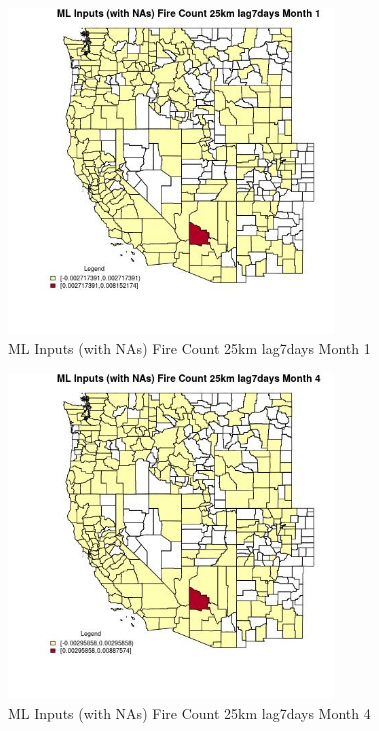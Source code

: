 \begin{figure} 
\centering  
\includegraphics[width=0.77\textwidth]{Code_Outputs/Report_ML_input_PM25_Step4_part_e_de_duplicated_aves_compiled_2019-05-20wNAs_CountyFire_Count_25km_lag7daysmedianMonth1.jpg} 
\caption{\label{fig:Report_ML_input_PM25_Step4_part_e_de_duplicated_aves_compiled_2019-05-20wNAsCountyFire_Count_25km_lag7daysmedianMonth1}ML Inputs (with NAs) Fire Count 25km lag7days Month 1} 
\end{figure} 
 

\begin{figure} 
\centering  
\includegraphics[width=0.77\textwidth]{Code_Outputs/Report_ML_input_PM25_Step4_part_e_de_duplicated_aves_compiled_2019-05-20wNAs_CountyFire_Count_25km_lag7daysmedianMonth4.jpg} 
\caption{\label{fig:Report_ML_input_PM25_Step4_part_e_de_duplicated_aves_compiled_2019-05-20wNAsCountyFire_Count_25km_lag7daysmedianMonth4}ML Inputs (with NAs) Fire Count 25km lag7days Month 4} 
\end{figure} 
 


